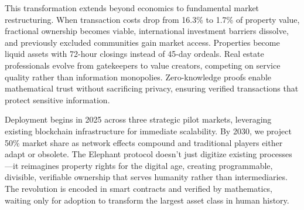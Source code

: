 This transformation extends beyond economics to fundamental market restructuring. When transaction costs drop from 16.3\% to 1.7\% of property value, fractional ownership becomes viable, international investment barriers dissolve, and previously excluded communities gain market access. Properties become liquid assets with 72-hour closings instead of 45-day ordeals. Real estate professionals evolve from gatekeepers to value creators, competing on service quality rather than information monopolies. Zero-knowledge proofs enable mathematical trust without sacrificing privacy, ensuring verified transactions that protect sensitive information.

Deployment begins in 2025 across three strategic pilot markets, leveraging existing blockchain infrastructure for immediate scalability. By 2030, we project 50\% market share as network effects compound and traditional players either adapt or obsolete. The Elephant protocol doesn't just digitize existing processes—it reimagines property rights for the digital age, creating programmable, divisible, verifiable ownership that serves humanity rather than intermediaries. The revolution is encoded in smart contracts and verified by mathematics, waiting only for adoption to transform the largest asset class in human history.